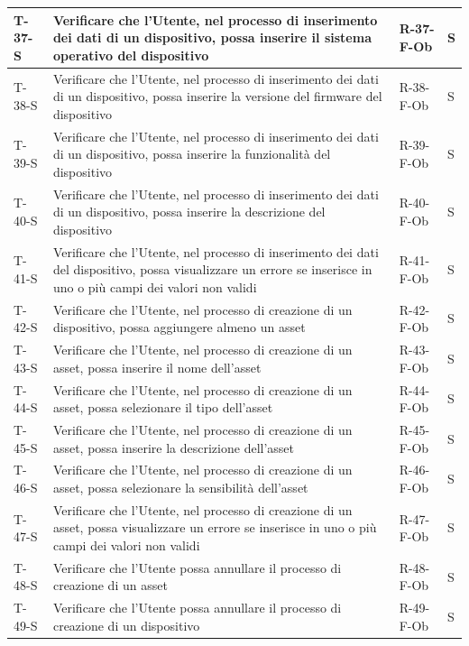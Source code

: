 \documentclass[a4paper,12pt]{article}
\begin{document}
{{\begin{longtable}{|p{}|p{}|p{}|p{}|}
                T-37-S & Verificare che l'Utente, nel processo di inserimento dei dati di un dispositivo, possa inserire il sistema operativo del dispositivo & R-37-F-Ob & S \\ \hline
                T-38-S & Verificare che l'Utente, nel processo di inserimento dei dati di un dispositivo, possa inserire la versione del firmware del dispositivo & R-38-F-Ob & S \\ \hline
                T-39-S & Verificare che l'Utente, nel processo di inserimento dei dati di un dispositivo, possa inserire la funzionalità del dispositivo & R-39-F-Ob & S \\ \hline
                T-40-S & Verificare che l'Utente, nel processo di inserimento dei dati di un dispositivo, possa inserire la descrizione del dispositivo & R-40-F-Ob & S \\ \hline
                T-41-S & Verificare che l'Utente, nel processo di inserimento dei dati del dispositivo, possa visualizzare un errore se inserisce in uno o più campi dei valori non validi & R-41-F-Ob & S \\ \hline
                T-42-S & Verificare che l'Utente, nel processo di creazione di un dispositivo, possa aggiungere almeno un asset & R-42-F-Ob & S \\ \hline
                T-43-S & Verificare che l'Utente, nel processo di creazione di un asset, possa inserire il nome dell'asset & R-43-F-Ob & S \\ \hline
                T-44-S & Verificare che l'Utente, nel processo di creazione di un asset, possa selezionare il tipo dell'asset & R-44-F-Ob & S \\ \hline
                T-45-S & Verificare che l'Utente, nel processo di creazione di un asset, possa inserire la descrizione dell'asset & R-45-F-Ob & S \\ \hline
                T-46-S & Verificare che l'Utente, nel processo di creazione di un asset, possa selezionare la sensibilità dell'asset & R-46-F-Ob & S \\ \hline
                T-47-S & Verificare che l'Utente, nel processo di creazione di un asset, possa visualizzare un errore se inserisce in uno o più campi dei valori non validi & R-47-F-Ob & S \\ \hline
                T-48-S & Verificare che l'Utente possa annullare il processo di creazione di un asset & R-48-F-Ob & S \\ \hline
                T-49-S & Verificare che l'Utente possa annullare il processo di creazione di un dispositivo & R-49-F-Ob & S \\ \hline

\end{longtable}}}
\end{document}
